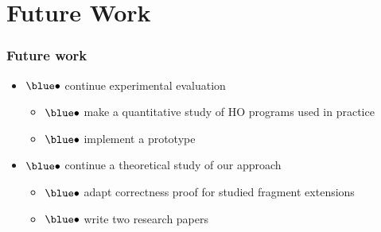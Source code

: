 \documentclass[xcolor=dvipsnames]{beamer}
\begin{document}
\section*{Future Work}
\begin{frame}
\frametitle{Future work}

\begin{itemize}
\item[]\hspace*{-3em} ${\blue \bullet}$  continue {\red experimental evaluation}  \pause

\begin{itemize} 
	\item[] {\hspace*{-3em} ${\blue \bullet}$ \normalsize make a {quantitative study} of HO programs used in practice} \pause
	\item[]  {\hspace*{-3em} ${\blue \bullet}$ \normalsize implement a prototype }   \pause \bigskip
\end{itemize} 

\item[] \hspace*{-3em} ${\blue \bullet}$ continue a {\red theoretical study} of our approach \pause
\begin{itemize}
\item[] {\hspace*{-3em} ${\blue \bullet}$ \normalsize adapt correctness proof for   studied fragment extensions} 
\item[] {\hspace*{-3em} ${\blue \bullet}$ \normalsize write two research papers} \pause
\end{itemize}
\end{itemize}
 \end{frame}
\end{document}
